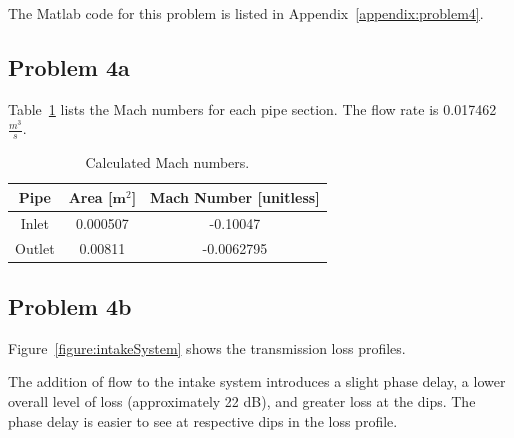 {{The Matlab code for this problem is listed in Appendix~\ref{appendix:problem4}.

\subsection*{Problem 4a}

Table~\ref{table:machNumbers} lists the Mach numbers for each pipe section.  The flow rate is 0.017462 $\frac{m^3}{s}$.

\setlength{\abovecaptionskip}{0pt}
\vspace{0.1cm}
{\renewcommand{\arraystretch}{1.5}
\begin{table}[h!]
    \begin{center}
        \small
        \begin{tabular}{ | c | c | c | }
            \hline
            \textbf{Pipe}  &  \textbf{Area [}{$\mathbf m^2$}\textbf{]}  &  \textbf{Mach Number [unitless]}  \\
            \hline
                Inlet  &  0.000507  &  -0.10047  \\
                \hline
                \rowcolor{Gray}
                Outlet  &  0.00811  &  -0.0062795  \\
            \hline
        \end{tabular}
    \end{center}
    \caption{Calculated Mach numbers.}
    \label{table:machNumbers}
\end{table}



\subsection*{Problem 4b}

\vspace{0.25cm}
Figure~\ref{figure:intakeSystem} shows the transmission loss profiles.


\vspace{0.25cm}
The addition of flow to the intake system introduces a slight phase delay, a lower overall level of loss (approximately 22 dB), and greater loss at the dips.  The phase delay is easier to see at respective dips in the loss profile.



}}}
